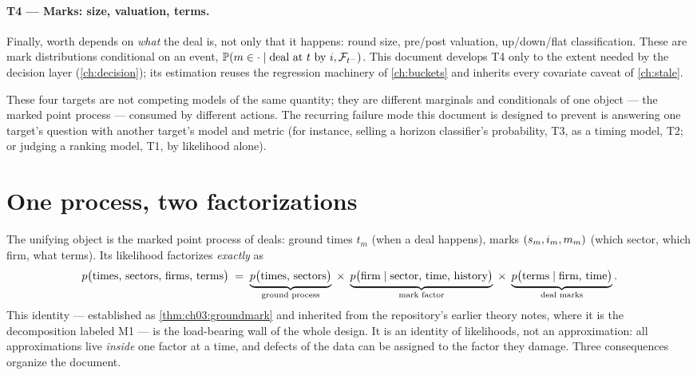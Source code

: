 \paragraph{T4 --- Marks: size, valuation, terms.}
Finally, worth depends on \emph{what} the deal is, not only that it happens:
round size, pre/post valuation, up/down/flat classification. These are mark
distributions conditional on an event, $\mathbb{P}(m \in \cdot \mid
\text{deal at } t \text{ by } i, \mathcal{F}_{t^-})$. This document develops T4 only to
the extent needed by the decision layer (\cref{ch:decision}); its
estimation reuses the regression machinery of \cref{ch:buckets} and
inherits every covariate caveat of \cref{ch:stale}.

These four targets are not competing models of the same quantity; they are
different marginals and conditionals of one object --- the marked point
process --- consumed by different actions. The recurring failure mode this
document is designed to prevent is answering one target's question with
another target's model and metric (for instance, selling a horizon
classifier's probability, T3, as a timing model, T2; or judging a ranking
model, T1, by likelihood alone).

\section{One process, two factorizations}\label{ch01:sec:factorization}

The unifying object is the marked point process of deals: ground times $t_m$
(when a deal happens), marks $(s_m, i_m, m_m)$ (which sector, which
firm, what terms). Its likelihood factorizes \emph{exactly} as
\begin{equation}\label{eq:ch01:groundmark}
p\big(\text{times, sectors, firms, terms}\big)
 \;=\;
 \underbrace{p\big(\text{times, sectors}\big)}_{\text{ground process}}
 \;\times\;
 \underbrace{p\big(\text{firm} \mid \text{sector, time, history}\big)}_{\text{mark factor}}
 \;\times\;
 \underbrace{p\big(\text{terms} \mid \text{firm, time}\big)}_{\text{deal marks}} .
\end{equation}
This identity --- established as \cref{thm:ch03:groundmark} and inherited
from the repository's earlier theory notes, where it is the decomposition
labeled M1 --- is the load-bearing wall of the whole design. It is an
identity of likelihoods, not an approximation: all approximations live
\emph{inside} one factor at a time, and defects of the data can be assigned
to the factor they damage. Three consequences organize the document.

